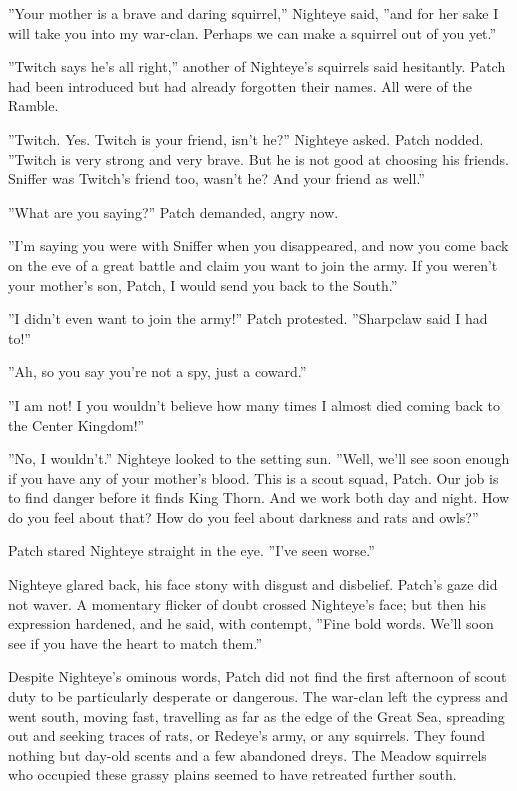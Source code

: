 \documentclass[12pt]{book}
\begin{document}
 ''Your mother is a brave and daring squirrel,'' Nighteye said, ''and for her sake I will take you into my war-clan. Perhaps we can make a squirrel out of you yet.''\par
 ''Twitch says he's all right,'' another of Nighteye's squirrels said hesitantly. Patch had been introduced but had already forgotten their names. All were of the Ramble.\par
 ''Twitch. Yes. Twitch is your friend, isn't he?'' Nighteye asked. Patch nodded. ''Twitch is very strong and very brave. But he is not good at choosing his friends. Sniffer was Twitch's friend too, wasn't he? And your friend as well.''\par
 ''What are you saying?'' Patch demanded, angry now.\par
 ''I'm saying you were with Sniffer when you disappeared, and now you come back on the eve of a great battle and claim you want to join the army. If you weren't your mother's son, Patch, I would send you back to the South.''\par
 ''I didn't even want to join the army!'' Patch protested. ''Sharpclaw said I had to!''\par
 ''Ah, so you say you're not a spy, just a coward.''\par
 ''I am not! I %
 you wouldn't believe how many times I almost died coming back to the Center Kingdom!''\par
 ''No, I wouldn't.'' Nighteye looked to the setting sun. ''Well, we'll see soon enough if you have any of your mother's blood. This is a scout squad, Patch. Our job is to find danger before it finds King Thorn. And we work both day and night. How do you feel about that? How do you feel about darkness and rats and owls?''\par
 Patch stared Nighteye straight in the eye. ''I've seen worse.''\par
 Nighteye glared back, his face stony with disgust and disbelief. Patch's gaze did not waver. A momentary flicker of doubt crossed Nighteye's face; but then his expression hardened, and he said, with contempt, ''Fine bold words. We'll soon see if you have the heart to match them.''\par
 Despite Nighteye's ominous words, Patch did not find the first afternoon of scout duty to be particularly desperate or dangerous. The war-clan left the cypress and went south, moving fast, travelling as far as the edge of the Great Sea, spreading out and seeking traces of rats, or Redeye's army, or any squirrels. They found nothing but day-old scents and a few abandoned dreys. The Meadow squirrels who occupied these grassy plains seemed to have retreated further south.\par
\end{document}
